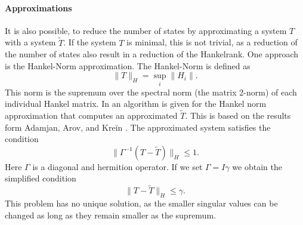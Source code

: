 \documentclass[doctype=mastersthesis,BCOR=15mm,biblatex]{ldvbook}%
\newcommand{\eye}{I} %
\begin{document}
\paragraph{Approximations}
It is also possible, to reduce the number of states by approximating a system $T$ with a system $\tilde{T}$.
If the system $T$ is minimal, this is not trivial, as a reduction of the number of states also result in a reduction of the Hankelrank.
One approach is the Hankel-Norm approximation.
The Hankel-Norm is defined as
\begin{equation}
	\|T\|_H = \sup_{i}\|H_i\|.
\end{equation}
This norm is the supremum over the spectral norm (the matrix 2-norm) of each individual Hankel matrix.
In \cite{dewilde_time-varying_1998} an algorithm is given for the Hankel norm approximation that computes an approximated $\tilde{T}$.  
This is based on the results form Adamjan, Arov, and Kreĭn \cite{adamjan_analytic_1971}.
The approximated system satisfies the condition
\begin{equation}
	\| \Gamma^{-1}(T-\tilde{T})\|_H \leq 1.
\end{equation}
Here $\Gamma$ is a diagonal and hermition operator. 
If we set $\Gamma = \eye\gamma$ we obtain the simplified condition
\begin{equation}
	\|T-\tilde{T}\|_H \leq \gamma.
\end{equation}
This problem has no unique solution, as the smaller singular values can be changed as long as they remain smaller as the supremum.
\end{document}
